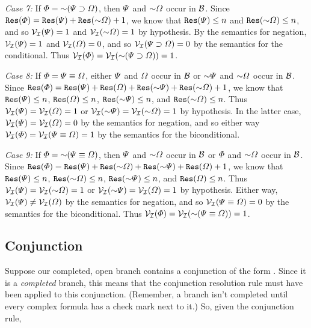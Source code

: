 \textit{Case 7:} 
If $\metaA=\enot(\metaB\eif\metaC)$, then $\varPsi$ and $\enot\metaC$ occur in $\mathcal{B}$.
Since $\res(\metaA) = \res(\metaB) + \res(\enot\metaC) + 1$, we know that $\texttt{Res}(\varPsi)\leq n$ and $\res(\enot\metaC)\leq n$, and so $\mathcal{V}_{\mathcal{I}}(\varPsi)=1$ and $\V{\I}(\enot\metaC)=1$ by hypothesis.  
By the semantics for negation, $\mathcal{V}_{\mathcal{I}}(\varPsi)=1$ and $\mathcal{V}_{\mathcal{I}}(\varOmega)=0$, and so $\mathcal{V}_{\mathcal{I}}(\varPsi\supset\varOmega)=0$ by the semantics for the conditional.
Thus $\V{\I}(\metaA)=\V{\I}(\enot(\metaB\eif\metaC))=1$.

\textit{Case 8:} 
If $\varPhi=\varPsi\equiv\varOmega$, either $\varPsi$ and $\varOmega$ occur in $\mathcal{B}$ or $\enot\metaB$ and $\enot\metaC$ occur in $\mathcal{B}$.
Since $\res(\metaA) = \res(\metaB) + \res(\metaC) + \res(\enot\metaB) + \res(\enot\metaC) + 1$, we know that $\texttt{Res}(\varPsi)\leq n$, $\texttt{Res}(\varOmega)\leq n$, $\res(\enot\metaB)\leq n$, and $\res(\enot\metaC)\leq n$.
Thus $\mathcal{V}_{\mathcal{I}}(\varPsi)=\mathcal{V}_{\mathcal{I}}(\varOmega)=1$ or $\V{\I}(\enot\metaB)=\V{\I}(\enot\metaC)=1$ by hypothesis.  
In the latter case, $\mathcal{V}_{\mathcal{I}}(\varPsi)=\mathcal{V}_{\mathcal{I}}(\varOmega)=0$ by the semantics for negation, and so either way $\mathcal{V}_{\mathcal{I}}(\varPhi)=\mathcal{V}_{\mathcal{I}}(\varPsi\equiv\varOmega)=1$ by the semantics for the biconditional.

\textit{Case 9:} 
If $\metaA=\enot(\metaB\eiff\metaC)$, then $\varPsi$ and $\enot\metaC$ occur in $\mathcal{B}$ or $\varPhi$ and $\enot\metaC$ occur in $\mathcal{B}$.
Since $\res(\metaA) = \res(\metaB) + \res(\enot\metaC) + \res(\enot\metaB) + \res(\metaC) + 1$, we know that $\texttt{Res}(\varPsi)\leq n$, $\res(\enot\metaC)\leq n$, $\res(\enot\metaB)\leq n$, and $\texttt{Res}(\varOmega)\leq n$.
Thus $\V{\I}(\metaB)=\V{\I}(\enot\metaC)=1$ or $\V{\I}(\enot\metaB)=\V{\I}(\metaC)=1$ by hypothesis.  
Either way, $\mathcal{V}_{\mathcal{I}}(\varPsi)\neq\mathcal{V}_{\mathcal{I}}(\varOmega)$ by the semantics for negation, and so $\mathcal{V}_{\mathcal{I}}(\varPsi\equiv\varOmega)=0$ by the semantics for the biconditional.
Thus $\V{\I}(\metaA)=\V{\I}(\enot(\metaB\eiff\metaC))=1$.





\subsection{Conjunction}
\label{conjunctionsound}
Suppose our completed, open branch contains a conjunction of the form \metaA{}\eand\metaB{}. Since it is a \emph{completed} branch, this means that the conjunction resolution rule must have been applied to this conjunction. (Remember, a branch isn't completed until every complex formula has a check mark next to it.) So, given the conjunction rule,

